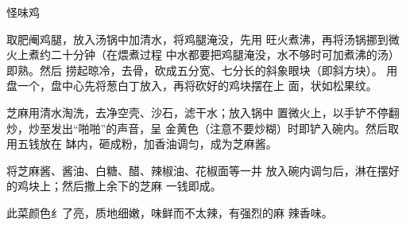 \begin{recipe}{怪味鸡}

\ingredients


\cooking

\step 取肥阉鸡腿，放入汤锅中加清水，将鸡腿淹没，先用 旺火煮沸，再将汤锅挪到微火上煮约二十分钟（在煨煮过程 中水都要把鸡腿淹没，水不够时可加煮沸的汤）即熟。然后 捞起晾冷，去骨，砍成五分宽、七分长的斜象眼块（即斜方块）。 用盘一个，盘中心先将葱白丁放入，再将砍好的鸡块摆在上 面，状如松果纹。

\step 芝麻用清水淘洗，去净空壳、沙石，滤干水；放入锅中 置微火上，以手铲不停翻炒，炒至发出“啪啪”的声音，呈 金黄色（注意不要炒糊）时即铲入碗内。然后取用五钱放在 缽内，砸成粉，加香油调匀，成为芝麻酱。

将芝麻酱、酱油、白糖、醋、辣椒油、花椒面等一并 放入碗内调匀后，淋在摆好的鸡块上；然后撒上余下的芝麻 一钱即成。

\notes

此菜颜色纟了亮，质地细嫩，味鲜而不太辣，有强烈的麻 辣香味。

\end{recipe}

